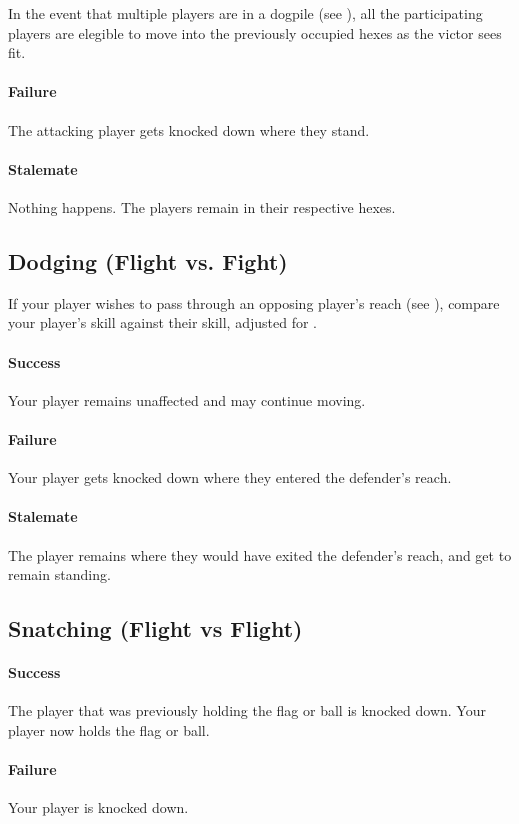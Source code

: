 \begin{note}
In the event that multiple players are in a dogpile (see ), all the participating players are elegible to move into the previously occupied hexes as the victor sees fit.
\end{note}
\paragraph{Failure}
The attacking player gets knocked down where they stand.
\paragraph{Stalemate}
Nothing happens.
The players remain in their respective hexes.

\subsection{Dodging (Flight vs. Fight)}
If your player wishes to pass through an opposing player's reach (see ), compare your player's \flight{} skill against their \fight{} skill, adjusted for \fate{}.

\paragraph{Success}
Your player remains unaffected and may continue moving.
\paragraph{Failure}
Your player gets knocked down where they entered the defender's reach.
\paragraph{Stalemate}
The player remains where they would have exited the defender's reach, and get to remain standing.

\subsection{Snatching (Flight vs Flight)}
\paragraph{Success}
The player that was previously holding the flag or ball is knocked down.
Your player now holds the flag or ball.
\paragraph{Failure}
Your player is knocked down.
